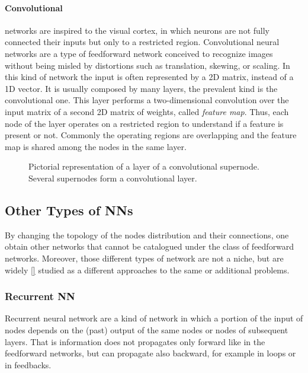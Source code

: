 \paragraph{Convolutional}\label{par:Convolutional} networks are inspired to the visual cortex, in which neurons are not fully connected their inputs but only to a restricted region.
Convolutional neural networks are a type of feedforward network conceived to recognize images without being misled by distortions such as translation, skewing, or scaling.
In this kind of network the input is often represented by a 2D matrix, instead of a 1D vector.
It is usually composed by many layers, the prevalent kind is the convolutional one.
This layer performs a two-dimensional convolution over the input matrix of a second 2D matrix of weights, called \textit{feature map}.
Thus, each node of the layer operates on a restricted region to understand if a feature is present or not.
Commonly the operating regions are overlapping and the feature map is shared among the nodes in the same layer.

\begin{figure}[ht]
	\centering
	
	\caption{%
		Pictorial representation of a layer of a convolutional supernode.
		Several supernodes form a convolutional layer.
		}
	\label{fig:convolutionalNN}
\end{figure}


\subsection{Other Types of NNs}
\label{ssec:Other_Types_of_NNs}
By changing the topology of the nodes distribution and their connections, one obtain other networks that cannot be catalogued under the class of feedforward networks.
Moreover, those different types of network are not a niche, but are widely \ref{} studied as a different approaches to the same or additional problems.

\subsubsection{Recurrent NN}
\label{sssec:Recurrent_NN}
Recurrent neural network are a kind of network in which a portion of the input of nodes depends on the (past) output of the same nodes or nodes of subsequent layers.
That is information does not propagates only forward like in the feedforward networks, but can propagate also backward, for example in loops or in feedbacks.

